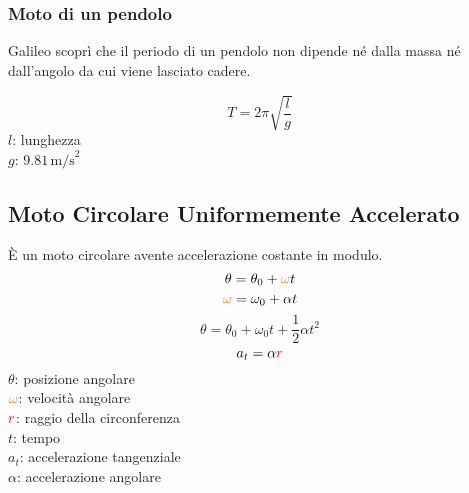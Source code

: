 \subsubsection{Moto di un pendolo}
Galileo scoprì che il periodo di un pendolo non dipende né dalla massa né dall'angolo da cui viene
lasciato cadere.
\begin{center}
\end{center}
\begin{equation*}
  T = 2\pi\sqrt{\frac{l}{g}}
\end{equation*}
$l$: lunghezza\\
\hyperref[tab:g]{$g$}: $9.81\,\text{m/s}^2$

\subsection{Moto Circolare Uniformemente Accelerato}\label{subsec:cinematica:mrua}
È un moto circolare avente accelerazione costante in modulo.
\begin{equation*}
  \theta = \theta_0 + \mathcolor{orange}{\omega}t
\end{equation*}
\begin{equation*}
  \mathcolor{orange}{\omega} = \omega_0 + \alpha t
\end{equation*}
\begin{equation*}
  \theta = \theta_0 + \omega_0t + \frac{1}{2}\alpha t^2
\end{equation*}
\begin{equation*}
  a_t = \alpha \mathcolor{red}{r}
\end{equation*}
$\theta$: posizione angolare\\
$\mathcolor{orange}{\omega}$: velocità angolare\\
$\mathcolor{red}{r}$: raggio della circonferenza\\
$t$: tempo\\
$a_t$: accelerazione tangenziale\\
$\alpha$: accelerazione angolare
